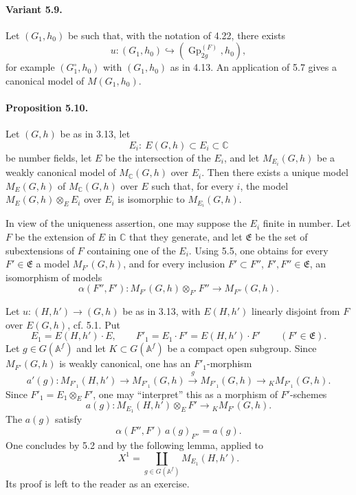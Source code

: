 \documentclass[10pt]{article}
\newcommand{\Af}{\mathbb A^f}
\newcommand{\C}{\mathbb C}
\newcommand{\Gp}{\operatorname{Gp}}
\newcommand{\MC}{M_{\C}}
\begin{document}
\paragraph{Variant 5.9.} Let $(G_1,h_0)$ be such that, with the notation of 4.22, there exists
\[
u:(G_1,h_0)\hookrightarrow(\Gp_{2g}^{(F)},h_0),
\]
for example $(G_1^\circ,h_0)$ with $(G_1,h_0)$ as in 4.13. An application of 5.7 gives a canonical model of $M(G_1,h_0)$.

\paragraph{Proposition 5.10.} Let $(G,h)$ be as in 3.13, let
\[
E_i:\ E(G,h)\subset E_i\subset\C
\]
be number fields, let $E$ be the intersection of the $E_i$, and let $M_{E_i}(G,h)$ be a weakly canonical model of $\MC(G,h)$ over $E_i$. Then there exists a unique model $M_E(G,h)$ of $\MC(G,h)$ over $E$ such that, for every $i$, the model $M_E(G,h)\otimes_EE_i$ over $E_i$ is isomorphic to $M_{E_i}(G,h)$.

In view of the uniqueness assertion, one may suppose the $E_i$ finite in number. Let $F$ be the extension of $E$ in $\C$ that they generate, and let $\mathfrak E$ be the set of subextensions of $F$ containing one of the $E_i$. Using 5.5, one obtains for every $F'\in\mathfrak E$ a model $M_{F'}(G,h)$, and for every inclusion $F'\subset F''$, $F',F''\in\mathfrak E$, an isomorphism of models
\[
\alpha(F'',F'):M_{F'}(G,h)\otimes_{F'}F''\longrightarrow M_{F''}(G,h).
\]

Let $u:(H,h')\to(G,h)$ be as in 3.13, with $E(H,h')$ linearly disjoint from $F$ over $E(G,h)$, cf. 5.1. Put
\[
E_1=E(H,h')\cdot E,\qquad F'_1=E_1\cdot F'=E(H,h')\cdot F'\qquad(F'\in\mathfrak E).
\]
Let $g\in G(\Af)$ and let $K\subset G(\Af)$ be a compact open subgroup. Since $M_{F'}(G,h)$ is weakly canonical, one has an $F'_1$-morphism
\[
a'(g):M_{F'_1}(H,h')\longrightarrow M_{F'_1}(G,h)
 \xrightarrow{\ g\ } M_{F'_1}(G,h)
 \longrightarrow {}_K M_{F'_1}(G,h).
\]
Since $F'_1=E_1\otimes_EF'$, one may ``interpret'' this as a morphism of $F'$-schemes
\[
a(g):M_{E_1}(H,h')\otimes_EF'\longrightarrow {}_K M_{F'}(G,h).
\]
The $a(g)$ satisfy
\[
\alpha(F'',F')\,a(g)_{F''}=a(g).
\]
One concludes by 5.2 and by the following lemma, applied to
\[
X^1=\coprod_{g\in G(\Af)}M_{E_1}(H,h').
\]
Its proof is left to the reader as an exercise.
\end{document}
